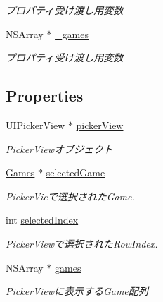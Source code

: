 \begin{DoxyCompactItemize}
\begin{DoxyCompactList}\small\item\em プロパティ受け渡し用変数 \end{DoxyCompactList}\item 
\hypertarget{interface_picker_alert_view_aa9d7283bd9c6374ee63ac8017032c40d}{
NSArray $\ast$ \hyperlink{interface_picker_alert_view_aa9d7283bd9c6374ee63ac8017032c40d}{\_\-games}}
\label{interface_picker_alert_view_aa9d7283bd9c6374ee63ac8017032c40d}

\begin{DoxyCompactList}\small\item\em プロパティ受け渡し用変数 \end{DoxyCompactList}\end{DoxyCompactItemize}
\subsection*{Properties}
\begin{DoxyCompactItemize}
\item 
\hypertarget{interface_picker_alert_view_aa6097903071c8ebbd99c1735305f08c9}{
UIPickerView $\ast$ \hyperlink{interface_picker_alert_view_aa6097903071c8ebbd99c1735305f08c9}{pickerView}}
\label{interface_picker_alert_view_aa6097903071c8ebbd99c1735305f08c9}

\begin{DoxyCompactList}\small\item\em PickerViewオブジェクト \end{DoxyCompactList}\item 
\hypertarget{interface_picker_alert_view_a2cb1c29a88dded150a2bdc5fb2a19553}{
\hyperlink{interface_games}{Games} $\ast$ \hyperlink{interface_picker_alert_view_a2cb1c29a88dded150a2bdc5fb2a19553}{selectedGame}}
\label{interface_picker_alert_view_a2cb1c29a88dded150a2bdc5fb2a19553}

\begin{DoxyCompactList}\small\item\em PickerVieで選択されたGame. \end{DoxyCompactList}\item 
\hypertarget{interface_picker_alert_view_a766d2add07dbe438f43f8ca360ee91cc}{
int \hyperlink{interface_picker_alert_view_a766d2add07dbe438f43f8ca360ee91cc}{selectedIndex}}
\label{interface_picker_alert_view_a766d2add07dbe438f43f8ca360ee91cc}

\begin{DoxyCompactList}\small\item\em PickerViewで選択されたRowIndex. \end{DoxyCompactList}\item 
\hypertarget{interface_picker_alert_view_a96544b6ce55302d60a52388dd1b040bc}{
NSArray $\ast$ \hyperlink{interface_picker_alert_view_a96544b6ce55302d60a52388dd1b040bc}{games}}
\label{interface_picker_alert_view_a96544b6ce55302d60a52388dd1b040bc}

\begin{DoxyCompactList}\small\item\em PickerViewに表示するGame配列 \end{DoxyCompactList}\end{DoxyCompactItemize}


